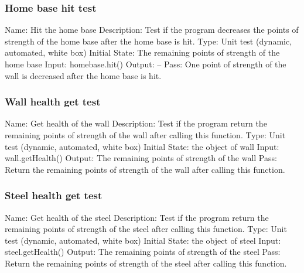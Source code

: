 \documentclass{article}
\begin{document}
\subsubsection{Home base hit test}
Name:  Hit the home base\newline
Description: Test if the program decreases the points of strength of the home base after the home base is hit. \newline
Type: Unit test (dynamic, automated, white box) \newline
Initial State:  The remaining points of strength of the home base\newline
Input: homebase.hit()\newline
Output: --\newline
Pass:  One point of strength of the wall is decreased after the home base is hit. \newline

\subsubsection{Wall health get test}
Name:  Get health of the wall\newline
Description: Test if the program return the remaining points of strength of the wall after calling this function. \newline
Type: Unit test (dynamic, automated, white box) \newline
Initial State:  the object of wall\newline
Input: wall.getHealth()\newline
Output: The remaining points of strength of the wall\newline
Pass:  Return the remaining points of strength of the wall after calling this function. \newline

\subsubsection{Steel health get test}
Name:  Get health of the steel\newline
Description: Test if the program return the remaining points of strength of the steel after calling this function. \newline
Type: Unit test (dynamic, automated, white box) \newline
Initial State:  the object of steel\newline
Input: steel.getHealth()\newline
Output: The remaining points of strength of the steel\newline
Pass:  Return the remaining points of strength of the steel after calling this function. \newline
\end{document}
